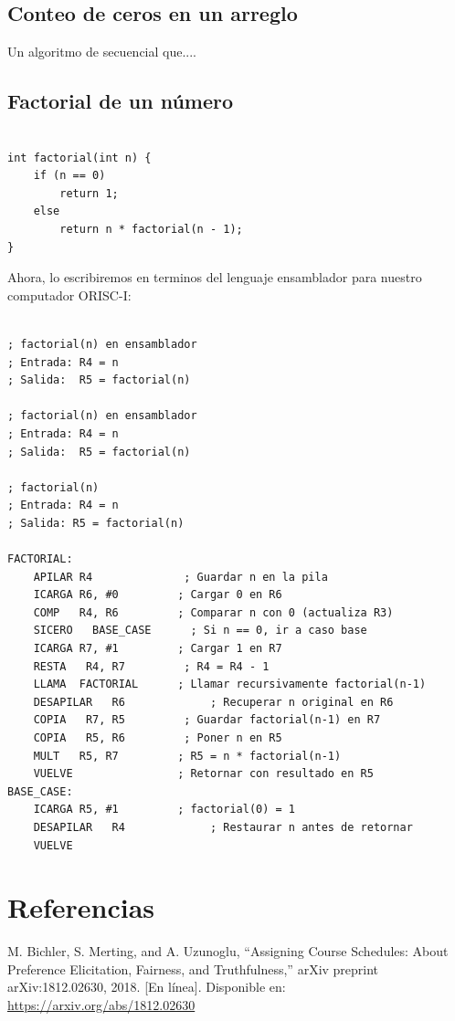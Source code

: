 \documentclass{article}
\begin{document}
\subsection{Conteo de ceros en un arreglo}

Un algoritmo de secuencial que....

\subsection{Factorial de un número}

\begin{verbatim}

int factorial(int n) {
    if (n == 0)
        return 1;
    else
        return n * factorial(n - 1);
}
\end{verbatim}
Ahora, lo escribiremos en terminos del lenguaje ensamblador para nuestro computador ORISC-I:

\begin{verbatim}

; factorial(n) en ensamblador
; Entrada: R4 = n
; Salida:  R5 = factorial(n)

; factorial(n) en ensamblador
; Entrada: R4 = n
; Salida:  R5 = factorial(n)

; factorial(n)
; Entrada: R4 = n
; Salida: R5 = factorial(n)

FACTORIAL:
    APILAR R4              ; Guardar n en la pila
    ICARGA R6, #0         ; Cargar 0 en R6
    COMP   R4, R6         ; Comparar n con 0 (actualiza R3)
    SICERO   BASE_CASE      ; Si n == 0, ir a caso base
    ICARGA R7, #1         ; Cargar 1 en R7
    RESTA   R4, R7         ; R4 = R4 - 1
    LLAMA  FACTORIAL      ; Llamar recursivamente factorial(n-1)
    DESAPILAR   R6             ; Recuperar n original en R6
    COPIA   R7, R5         ; Guardar factorial(n-1) en R7
    COPIA   R5, R6         ; Poner n en R5
    MULT   R5, R7         ; R5 = n * factorial(n-1)
    VUELVE                ; Retornar con resultado en R5
BASE_CASE:
    ICARGA R5, #1         ; factorial(0) = 1
    DESAPILAR   R4             ; Restaurar n antes de retornar
    VUELVE

\end{verbatim}




\section{Referencias}
\renewcommand{\refname}{}

\begin{thebibliography}{9}

 \label{ref:BPS} M. Bichler, S. Merting, and A. Uzunoglu, 
“Assigning Course Schedules: About Preference Elicitation, Fairness, and Truthfulness,” 
arXiv preprint arXiv:1812.02630, 2018. [En línea]. Disponible en: 
\url{https://arxiv.org/abs/1812.02630}


\end{thebibliography}
\end{document}
